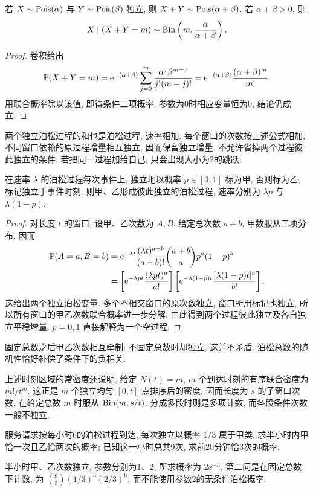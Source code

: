 \begin{proposition}[泊松变量的叠加]
若 $X\sim\operatorname{Pois}(\alpha)$ 与 $Y\sim\operatorname{Pois}(\beta)$ 独立, 则 $X+Y\sim\operatorname{Pois}(\alpha+\beta)$. 若 $\alpha+\beta>0$, 则
\[
X\mid(X+Y=m)\sim\operatorname{Bin}\left(m,\frac{\alpha}{\alpha+\beta}\right).
\]
\end{proposition}
\begin{proof}
卷积给出
\[
\mathbb P(X+Y=m)=\mathrm e^{-(\alpha+\beta)}\sum_{j=0}^m
\frac{\alpha^j\beta^{m-j}}{j!(m-j)!}
=\mathrm e^{-(\alpha+\beta)}\frac{(\alpha+\beta)^m}{m!}.
\]
用联合概率除以该值, 即得条件二项概率. 参数为0时相应变量恒为0, 结论仍成立.
\end{proof}
两个独立泊松过程的和也是泊松过程, 速率相加. 每个窗口的次数按上述公式相加, 不同窗口依赖的原过程增量相互独立, 因而保留独立增量. 不允许省掉两个过程彼此独立的条件: 若把同一过程加给自己, 只会出现大小为2的跳跃.

\begin{theorem}[独立标记与泊松分裂]
在速率 $\lambda$ 的泊松过程每次事件上, 独立地以概率 $p\in[0,1]$ 标为甲, 否则标为乙; 标记独立于事件时刻. 则甲、乙形成彼此独立的泊松过程, 速率分别为 $\lambda p$ 与 $\lambda(1-p)$.
\end{theorem}
\begin{proof}
对长度 $t$ 的窗口, 设甲、乙次数为 $A,B$. 给定总次数 $a+b$, 甲数服从二项分布, 因而
\begin{align*}
\mathbb P(A=a,B=b)
&=\mathrm e^{-\lambda t}\frac{(\lambda t)^{a+b}}{(a+b)!}
\binom{a+b}{a}p^a(1-p)^b\\
&=\left[\mathrm e^{-\lambda pt}\frac{(\lambda pt)^a}{a!}\right]
\left[\mathrm e^{-\lambda(1-p)t}\frac{[\lambda(1-p)t]^b}{b!}\right].
\end{align*}
这给出两个独立泊松变量. 多个不相交窗口的原次数独立, 窗口所用标记也独立, 所以所有窗口的甲乙次数联合概率进一步分解. 由此得到两个过程彼此独立及各自独立平稳增量. $p=0,1$ 直接解释为一个空过程.
\end{proof}
固定总数之后甲乙次数相互牵制; 不固定总数时却独立, 这并不矛盾. 泊松总数的随机性恰好补偿了条件下的负相关.

上述时刻区域的常密度还说明, 给定 $N(t)=m$, $m$ 个到达时刻的有序联合密度为 $m!/t^m$. 这正是 $m$ 个独立均匀 $[0,t]$ 点排序后的密度. 因而长度为 $s$ 的子窗口次数, 在给定总数 $m$ 时服从 $\operatorname{Bin}(m,s/t)$. 分成多段时则是多项计数, 而各段条件次数一般不独立.

\begin{example}
服务请求按每小时6的泊松过程到达, 每次独立以概率 $1/3$ 属于甲类. 求半小时内甲恰一次且乙恰两次的概率; 已知这一小时总共9次, 求前20分钟恰3次的概率.
\end{example}
\begin{solution}
半小时甲、乙次数独立, 参数分别为1、2, 所求概率为 $2\ee^{-3}$. 第二问是在固定总数下计数, 为
$\binom93(1/3)^3(2/3)^6$, 而不能使用参数2的无条件泊松概率.
\end{solution}

